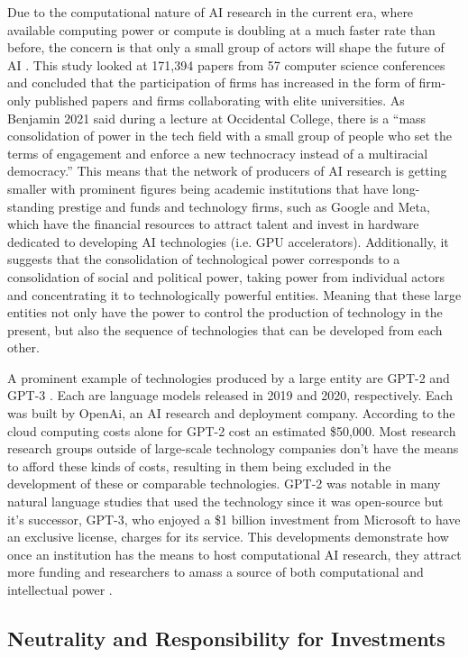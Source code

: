 \documentclass[10pt,twocolumn]{article}
\begin{document}
Due to the computational nature of AI research in the current era, where available computing power or compute is doubling at a much faster rate than before, the concern is that only a small group of actors will shape the future of AI \cite{Ahmed2020}. This study looked at 171,394 papers from 57 computer science conferences and concluded that the participation of firms has increased in the form of firm-only published papers and firms collaborating with elite universities. As Benjamin 2021 said during a lecture at Occidental College, there is a “mass consolidation of power in the tech field with a small group of people who set the terms of engagement and enforce a new technocracy instead of a multiracial democracy.” This means that the network of producers of AI research is getting smaller with prominent figures being academic institutions that have long-standing prestige and funds and technology firms, such as Google and Meta, which have the financial resources to attract talent and invest in hardware dedicated to developing AI technologies (i.e. GPU accelerators). Additionally, it suggests that the consolidation of technological power corresponds to a consolidation of social and political power, taking power from individual actors and concentrating it to technologically powerful entities. Meaning that these large entities not only have the power to control the production of technology in the present, but also the sequence of technologies that can be developed from each other.

A prominent example of technologies produced by a large entity are GPT-2 and GPT-3 \cite{Schmelzer2021}. Each are language models released in 2019 and 2020, respectively. Each was built by OpenAi, an AI research and deployment company. According to \cite{Cohen2019} the cloud computing costs alone for GPT-2 cost an estimated \$50,000. Most research research groups outside of large-scale technology companies don’t have the means to afford these kinds of costs, resulting in them being excluded in the development of these or comparable technologies. GPT-2 was notable in many natural language studies that used the technology since it was open-source but it’s successor, GPT-3, who enjoyed a \$1 billion investment from Microsoft to have an exclusive license, charges for its service. This developments demonstrate how once an institution has the means to host computational AI research, they attract more funding and researchers to amass a source of both computational and intellectual power \cite{Knight2018}.

\subsection{Neutrality and Responsibility for Investments}
\end{document}
